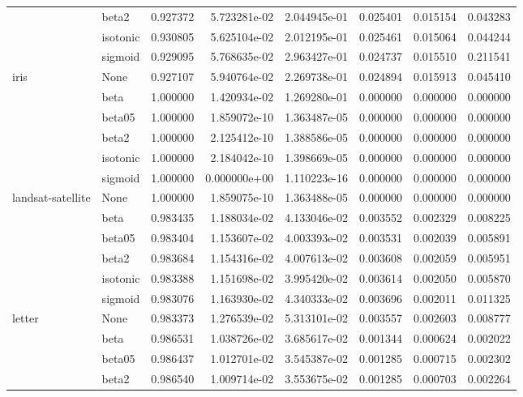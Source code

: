 \begin{tabular}{llrrrrrr}
        & beta2 &  0.927372 &  5.723281e-02 &  2.044945e-01 &  0.025401 &  0.015154 &  0.043283 \\
        & isotonic &  0.930805 &  5.625104e-02 &  2.012195e-01 &  0.025461 &  0.015064 &  0.044244 \\
        & sigmoid &  0.929095 &  5.768635e-02 &  2.963427e-01 &  0.024737 &  0.015510 &  0.211541 \\
iris & None &  0.927107 &  5.940764e-02 &  2.269738e-01 &  0.024894 &  0.015913 &  0.045410 \\
        & beta &  1.000000 &  1.420934e-02 &  1.269280e-01 &  0.000000 &  0.000000 &  0.000000 \\
        & beta05 &  1.000000 &  1.859072e-10 &  1.363487e-05 &  0.000000 &  0.000000 &  0.000000 \\
        & beta2 &  1.000000 &  2.125412e-10 &  1.388586e-05 &  0.000000 &  0.000000 &  0.000000 \\
        & isotonic &  1.000000 &  2.184042e-10 &  1.398669e-05 &  0.000000 &  0.000000 &  0.000000 \\
        & sigmoid &  1.000000 &  0.000000e+00 &  1.110223e-16 &  0.000000 &  0.000000 &  0.000000 \\
landsat-satellite & None &  1.000000 &  1.859075e-10 &  1.363488e-05 &  0.000000 &  0.000000 &  0.000000 \\
        & beta &  0.983435 &  1.188034e-02 &  4.133046e-02 &  0.003552 &  0.002329 &  0.008225 \\
        & beta05 &  0.983404 &  1.153607e-02 &  4.003393e-02 &  0.003531 &  0.002039 &  0.005891 \\
        & beta2 &  0.983684 &  1.154316e-02 &  4.007613e-02 &  0.003608 &  0.002059 &  0.005951 \\
        & isotonic &  0.983388 &  1.151698e-02 &  3.995420e-02 &  0.003614 &  0.002050 &  0.005870 \\
        & sigmoid &  0.983076 &  1.163930e-02 &  4.340333e-02 &  0.003696 &  0.002011 &  0.011325 \\
letter & None &  0.983373 &  1.276539e-02 &  5.313101e-02 &  0.003557 &  0.002603 &  0.008777 \\
        & beta &  0.986531 &  1.038726e-02 &  3.685617e-02 &  0.001344 &  0.000624 &  0.002022 \\
        & beta05 &  0.986437 &  1.012701e-02 &  3.545387e-02 &  0.001285 &  0.000715 &  0.002302 \\
        & beta2 &  0.986540 &  1.009714e-02 &  3.553675e-02 &  0.001285 &  0.000703 &  0.002264 \\

\end{tabular}
